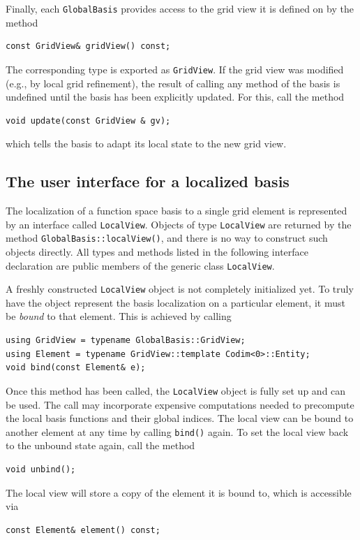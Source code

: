 \documentclass[a4paper,10pt,headings=normal,bibliography=totoc]{scrartcl}
\newcommand{\cpp}[1]{\lstinline[basicstyle=\ttfamily]!#1!}
\begin{document}
Finally, each \cpp{GlobalBasis} provides access to the grid view it is defined on
by the method
\begin{lstlisting}[style=Interface]
const GridView& gridView() const;
\end{lstlisting}
The corresponding type
is exported as \cpp{GridView}. If the grid view
was modified (e.g., by local grid refinement), the result of calling any
method of the basis is undefined until the basis has been explicitly updated.
For this, call the method
\begin{lstlisting}[style=Interface]
void update(const GridView & gv);
\end{lstlisting}
which tells the basis to adapt its local state to the new grid view.


\subsection{The user interface for a localized basis}
\label{sec:localview_interface}

The localization of a function space basis to a single grid element is represented
by an interface called \cpp{LocalView}. Objects of type
\cpp{LocalView} are returned by the method \cpp{GlobalBasis::localView()},
and there is no way to construct such objects directly.
All types and methods listed in the following
interface declaration are public members of
the generic class \cpp{LocalView}.

A freshly constructed \cpp{LocalView} object is not completely initialized yet.
To truly have the object represent the basis localization on a particular element,
it must be \emph{bound} to that element.  This is achieved by calling
\begin{lstlisting}[style=Interface]
using GridView = typename GlobalBasis::GridView;
using Element = typename GridView::template Codim<0>::Entity;
void bind(const Element& e);
\end{lstlisting}
Once this method has been called, the \cpp{LocalView} object is fully set up
and can be used.
The call may incorporate expensive computations needed to
precompute the local basis functions and their global indices.
The local view can be
bound to another element at any time by calling \cpp{bind()} again.
To set the local view back to the unbound state again, call the method
\begin{lstlisting}[style=Interface]
void unbind();
\end{lstlisting}
The local view will store a copy of the
element it is bound to, which is accessible via
\begin{lstlisting}[style=Interface]
const Element& element() const;
\end{lstlisting}
\end{document}
